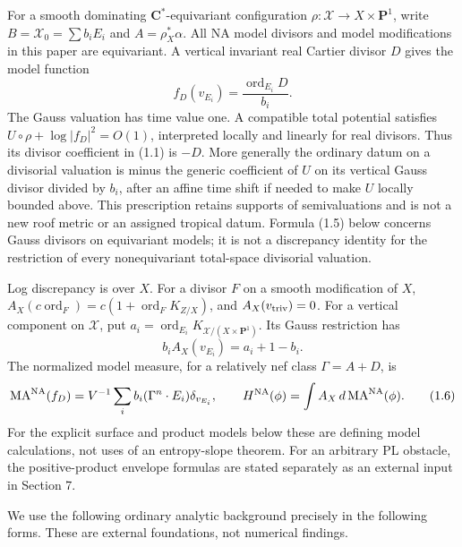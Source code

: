 \documentclass[
  11pt,
]{article}
\begin{document}
For a smooth dominating \(\mathbf C^*\)-equivariant configuration
\(\rho:\mathcal X\to X\times\mathbf P^1\), write
\(B=\mathcal X_0=\sum b_iE_i\) and \(A=\rho_X^*\alpha\). All NA model
divisors and model modifications in this paper are equivariant. A
vertical invariant real Cartier divisor \(D\) gives the model function
\[
 f_D(v_{E_i})=\frac{\operatorname{ord}_{E_i}D}{b_i}.
                                                               \tag{1.4}
\] The Gauss valuation has time value one. A compatible total potential
satisfies \(U\circ\rho+\log|f_D|^2=O(1)\), interpreted locally and
linearly for real divisors. Thus its divisor coefficient in (1.1) is
\(-D\). More generally the ordinary datum on a divisorial valuation is
minus the generic coefficient of \(U\) on its vertical Gauss divisor
divided by \(b_i\), after an affine time shift if needed to make \(U\)
locally bounded above. This prescription retains supports of
semivaluations and is not a new roof metric or an assigned tropical
datum. Formula (1.5) below concerns Gauss divisors on equivariant
models; it is not a discrepancy identity for the restriction of every
nonequivariant total-space divisorial valuation.

Log discrepancy is over \(X\). For a divisor \(F\) on a smooth
modification of \(X\),
\(A_X(c\operatorname{ord}_F)=c(1+\operatorname{ord}_FK_{Z/X})\), and
\(A_X(v_{\rm triv})=0\). For a vertical component on \(\mathcal X\), put
\(a_i=\operatorname{ord}_{E_i}K_{\mathcal X/(X\times\mathbf P^1)}\). Its
Gauss restriction has \[
 b_iA_X(v_{E_i})=a_i+1-b_i.
                                                               \tag{1.5}
\] The normalized model measure, for a relatively nef class
\(\Gamma=A+D\), is \[
 \operatorname{MA}^{\rm NA}(f_D)
 =V^{-1}\sum_i b_i(\Gamma^n\cdot E_i)\delta_{v_{E_i}},
 \qquad H^{\rm NA}(\phi)=\int A_X\,d\operatorname{MA}^{\rm NA}(\phi).
                                                               \tag{1.6}
\] For the explicit surface and product models below these are defining
model calculations, not uses of an entropy-slope theorem. For an
arbitrary PL obstacle, the positive-product envelope formulas are stated
separately as an external input in Section 7.

We use the following ordinary analytic background precisely in the
following forms. These are external foundations, not numerical findings.
\end{document}
